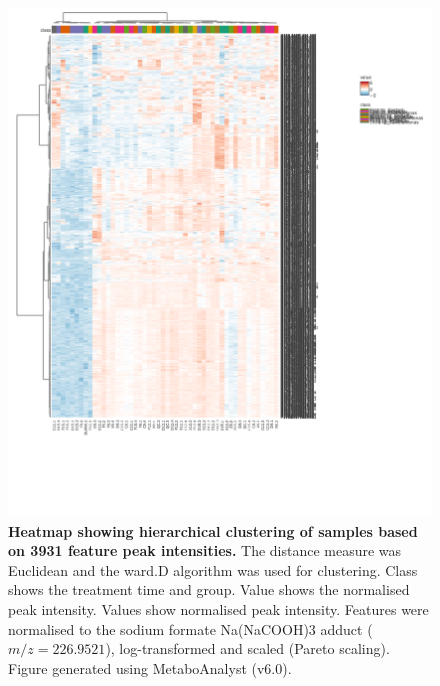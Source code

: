 \begin{figure}[htp!]
    \centering
    \includegraphics[width=\textwidth]{Figures/AllFeaturesAllSamples_Clustered.png}
    \caption[Heatmap showing hierarchical clustering of samples based on feature peak intensities.]{\textbf{Heatmap showing hierarchical clustering of samples based on 3931 feature peak intensities.} The distance measure was Euclidean and the ward.D algorithm was used for clustering. Class shows the treatment time and group. Value shows the normalised peak intensity. Values show normalised peak intensity. Features were normalised to the sodium formate Na(NaCOOH)3 adduct ($m/z=226.9521$), log-transformed and scaled (Pareto scaling). Figure generated using MetaboAnalyst (v6.0).}
    \label{fig:AllFeaturesAllSamples}
\end{figure}


